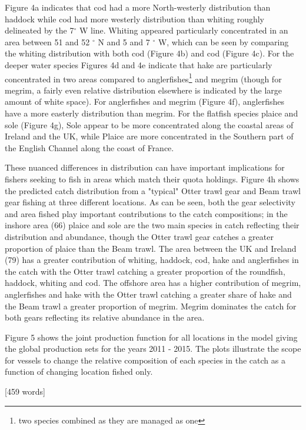 \documentclass{nature}
\begin{document}
\begin{linenumbers}
Figure 4a indicates that cod had a more North-westerly distribution than
haddock while cod had more westerly distribution than whiting roughly
delineated by the 7$^{\circ}$ W line. Whiting appeared particularly
concentrated in an area between 51 and 52 $^{\circ}$ N and 5 and 7 $^{\circ}$
W, which can be seen by comparing the whiting distribution with both cod
(Figure 4b) and cod (Figure 4c). For the deeper water species Figures 4d and 4e
indicate that hake are particularly concentrated in two areas compared to
anglerfishes\footnote{two species combined as they are managed as one} and
megrim (though for megrim, a fairly even relative distribution elsewhere is
indicated by the large amount of white space). For anglerfishes and megrim
(Figure 4f), anglerfishes have a more easterly distribution than megrim. For
the flatfish species plaice and sole (Figure 4g), Sole appear to be more
concentrated along the coastal areas of Ireland and the UK, while Plaice are
more concentrated in the Southern part of the English Channel along the coast
of France.

These nuanced differences in distribution can have important implications for
fishers seeking to fish in areas which match their quota holdings. Figure 4h
shows the predicted catch distribution from a "typical" Otter trawl gear and
Beam trawl gear fishing at three different locations. As can be seen, both the
gear selectivity and area fished play important contributions to the catch
compositions; in the inshore area (66) plaice and sole are the two main species
in catch reflecting their distribution and abundance, though the Otter trawl
gear catches a greater proportion of plaice than the Beam trawl. The area
between the UK and Ireland (79) has a greater contribution of whiting, haddock,
cod, hake and anglerfishes in the catch with the Otter trawl catching a greater
proportion of the roundfish, haddock, whiting and cod. The offshore area has a
higher contribution of megrim, anglerfishes and hake with the Otter trawl
catching a greater share of hake and the Beam trawl a greater proportion of
megrim. Megrim dominates the catch for both gears reflecting its relative
abundance in the area.

Figure 5 shows the joint production function for all locations in the model
giving the global production sets for the years 2011 - 2015. The plots
illustrate the scope for vessels to change the relative composition of each
species in the catch as a function of changing location fished only.

[459 words]


\end{linenumbers}
\end{document}
